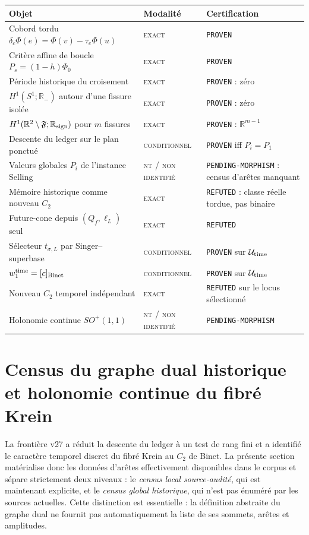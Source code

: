 \documentclass[11pt,a4paper]{article}
\newcommand{\statusExact}{\textsc{exact}}
\newcommand{\statusCond}{\textsc{conditionnel}}
\newcommand{\statusNT}{\textsc{nt / non identifié}}
\newcommand{\certProven}{\texttt{PROVEN}}
\newcommand{\certRefuted}{\texttt{REFUTED}}
\newcommand{\certPending}{\texttt{PENDING-MORPHISM}}
\begin{document}
\begin{longtable}{p{}p{}p{}}
\toprule
Objet & Modalité & Certification\\
\midrule
\endhead
Cobord tordu $\delta_c\Phi(e)=\Phi(v)-\tau_e\Phi(u)$ & \statusExact & \certProven\\
Critère affine de boucle $P_s=(1-h)\Phi_0$ & \statusExact & \certProven\\
Période historique du croisement & \statusExact & \certProven{} : zéro\\
$H^1(S^1;\mathbb R_-)$ autour d'une fissure isolée & \statusExact & \certProven{} : zéro\\
$H^1(\mathbb R^2\setminus\mathfrak F;\mathbb R_{\rm sign})$ pour $m$ fissures & \statusExact & \certProven{} : $\mathbb R^{m-1}$\\
Descente du ledger sur le plan ponctué & \statusCond & \certProven{} iff $P_i=P_1$\\
Valeurs globales $P_i$ de l'instance Selling & \statusNT & \certPending{} : census d'arêtes manquant\\
Mémoire historique comme nouveau $C_2$ & \statusExact & \certRefuted{} : classe réelle tordue, pas binaire\\
Future-cone depuis $(Q_f,\ell_L)$ seul & \statusExact & \certRefuted\\
Sélecteur $t_{\sigma,L}$ par Singer--superbase & \statusCond & \certProven{} sur $\mathcal U_{\rm time}$\\
$w_1^{\rm time}=[c]_{\rm Binet}$ & \statusCond & \certProven{} sur $\mathcal U_{\rm time}$\\
Nouveau $C_2$ temporel indépendant & \statusExact & \certRefuted{} sur le locus sélectionné\\
Holonomie continue $SO^+(1,1)$ & \statusNT & \certPending\\
\bottomrule
\end{longtable}

\section{Census du graphe dual historique et holonomie continue du fibré Krein}\label{sec:v28-global-census-boost}

La frontière v27 a réduit la descente du ledger à un test de rang fini et a identifié le caractère temporel discret du fibré Krein au $C_2$ de Binet. La présente section matérialise donc les données d'arêtes effectivement disponibles dans le corpus et sépare strictement deux niveaux : le \emph{census local source-audité}, qui est maintenant explicite, et le \emph{census global historique}, qui n'est pas énuméré par les sources actuelles. Cette distinction est essentielle : la définition abstraite du graphe dual ne fournit pas automatiquement la liste de ses sommets, arêtes et amplitudes.
\end{document}
